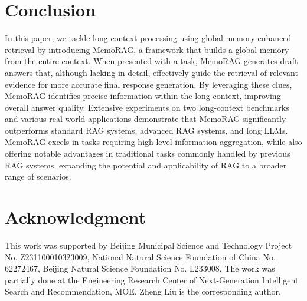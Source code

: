 \documentclass[sigconf]{acmart}
\begin{document}
\section{Conclusion}
In this paper, we tackle long-context processing using global memory-enhanced retrieval by introducing MemoRAG, a framework that builds a global memory from the entire context. When presented with a task, MemoRAG generates draft answers that, although lacking in detail, effectively guide the retrieval of relevant evidence for more accurate final response generation. By leveraging these clues, MemoRAG identifies precise information within the long context, improving overall answer quality.
Extensive experiments on two long-context benchmarks and various real-world applications demonstrate that MemoRAG significantly outperforms standard RAG systems, advanced RAG systems, and long LLMs. MemoRAG excels in tasks requiring high-level information aggregation, while also offering notable advantages in traditional tasks commonly handled by previous RAG systems, expanding the potential and applicability of RAG to a broader range of scenarios.

\section*{Acknowledgment }
This work was supported by Beijing Municipal Science and Technology Project No. Z231100010323009, National Natural Science Foundation of China No. 62272467, Beijing Natural Science Foundation No. L233008. The work was partially done at the Engineering Research Center of Next-Generation Intelligent Search and Recommendation, MOE. Zheng Liu is the corresponding author. 





\clearpage
\appendix
\end{document}

